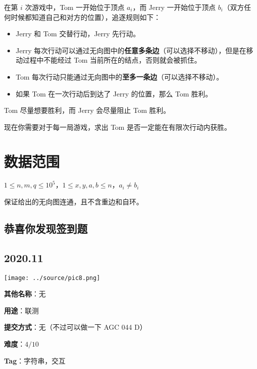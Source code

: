 \documentclass[a4paper,10pt]{article}
\begin{document}
在第 $i$ 次游戏中，Tom 一开始位于顶点 $a_i$，而 Jerry 一开始位于顶点 $b_i$（双方任何时候都知道自己和对方的位置），追逐规则如下：

\begin{itemize}
\item Jerry 和 Tom 交替行动，Jerry 先行动。

\item Jerry 每次行动可以通过无向图中的\textbf{任意多条边}（可以选择不移动），但是在移动过程中不能经过 Tom 当前所在的结点，否则就会被抓住。

\item Tom 每次行动只能通过无向图中的\textbf{至多一条边}（可以选择不移动）。

\item 如果 Tom 在一次行动后到达了 Jerry 的位置，那么 Tom 胜利。
\end{itemize}

Tom 尽量想要胜利，而 Jerry 会尽量阻止 Tom 胜利。

现在你需要对于每一局游戏，求出 Tom 是否一定能在有限次行动内获胜。

\section*{数据范围}

$1\leq n,m,q\leq 10^5$，$1\leq x,y,a,b\leq n$，$a_i\ne b_i$

保证给出的无向图连通，且不含重边和自环。

\newpage

\vspace*{\fill}
\begin{center}

\section{恭喜你发现签到题}

\subsection*{2020.11}

\vspace{10pt}

\texttt{[image: ../source/pic8.png]}

\vspace{10pt}

\textbf{其他名称}：无

\vspace{10pt}

\textbf{用途}：联测

\vspace{10pt}

\textbf{提交方式}：无（不过可以做一下 AGC 044 D）

\vspace{10pt}

\textbf{难度}：$4/10$

\vspace{10pt}

\textbf{Tag}：字符串，交互

\end{center}
\vspace*{\fill}
\end{document}

